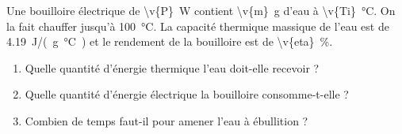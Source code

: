 Une bouilloire électrique de \qty{\v{P}}{W} contient \qty{\v{m}}{g} d'eau à \qty{\v{Ti}}{\degreeCelsius}. On la fait chauffer jusqu'à \qty{100}{\degreeCelsius}. La capacité thermique massique de l'eau est de \qty{4.19}{J/(g.\degreeCelsius)} et le rendement de la bouilloire est de \qty{\v{eta}}{\percent}.

\begin{enumerate}[label=\alph*)]
    \item Quelle quantité d'énergie thermique l'eau doit-elle recevoir ?
    \item Quelle quantité d'énergie électrique la bouilloire consomme-t-elle ?
    \item Combien de temps faut-il pour amener l'eau à ébullition ?
\end{enumerate}
